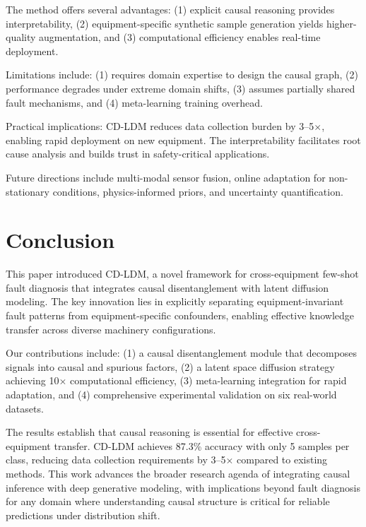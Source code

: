 \documentclass[lettersize,journal]{IEEEtran}
\begin{document}
The method offers several advantages: (1) explicit causal reasoning provides interpretability, (2) equipment-specific synthetic sample generation yields higher-quality augmentation, and (3) computational efficiency enables real-time deployment.

Limitations include: (1) requires domain expertise to design the causal graph, (2) performance degrades under extreme domain shifts, (3) assumes partially shared fault mechanisms, and (4) meta-learning training overhead.

Practical implications: CD-LDM reduces data collection burden by 3--5$\times$, enabling rapid deployment on new equipment. The interpretability facilitates root cause analysis and builds trust in safety-critical applications.

Future directions include multi-modal sensor fusion, online adaptation for non-stationary conditions, physics-informed priors, and uncertainty quantification.

\section{Conclusion}

This paper introduced CD-LDM, a novel framework for cross-equipment few-shot fault diagnosis that integrates causal disentanglement with latent diffusion modeling. The key innovation lies in explicitly separating equipment-invariant fault patterns from equipment-specific confounders, enabling effective knowledge transfer across diverse machinery configurations.

Our contributions include: (1) a causal disentanglement module that decomposes signals into causal and spurious factors, (2) a latent space diffusion strategy achieving 10$\times$ computational efficiency, (3) meta-learning integration for rapid adaptation, and (4) comprehensive experimental validation on six real-world datasets.

The results establish that causal reasoning is essential for effective cross-equipment transfer. CD-LDM achieves 87.3\% accuracy with only 5 samples per class, reducing data collection requirements by 3--5$\times$ compared to existing methods. This work advances the broader research agenda of integrating causal inference with deep generative modeling, with implications beyond fault diagnosis for any domain where understanding causal structure is critical for reliable predictions under distribution shift.



\end{document}
